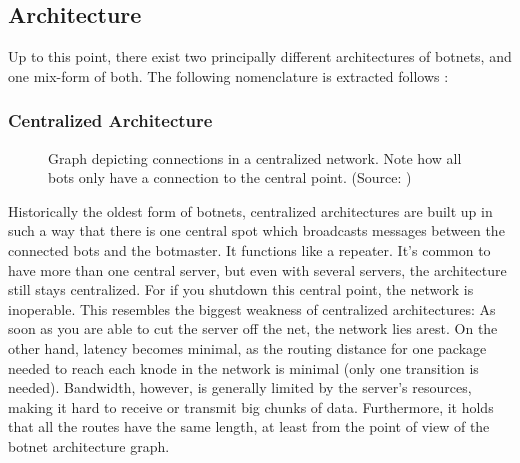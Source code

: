 \documentclass{llncs}
\begin{document}
\subsection{Architecture}
Up to this point, there exist two principally different architectures
of botnets, and one mix-form of both. The following nomenclature is
extracted follows \cite{steggink2007detection}:
\subsubsection{Centralized Architecture}
%
%
\begin{figure}[htbp]
  \centering
  \caption{Graph depicting connections in a centralized network. Note
    how all bots only have a connection to the central point. (Source:
    \cite{dittrich2007command})}
  \label{central-network}
\end{figure}
Historically the oldest form of botnets, centralized architectures are
built up in such a way that there is one central spot which broadcasts
messages between the connected bots and the botmaster. It functions
like a repeater. It's common to have more than one central
server\cite{td1sc}, but even with several servers, the architecture
still stays centralized. For if you shutdown this central point, the
network is inoperable. This resembles the biggest weakness of
centralized architectures: As soon as you are able to cut the server
off the net, the network lies arest. On the other hand, latency
becomes minimal, as the routing distance for one package needed to
reach each knode in the network is minimal (only one transition is
needed). Bandwidth, however, is generally limited by the server's
resources, making it hard to receive or transmit big chunks of
data. Furthermore, it holds that all the routes have the same length,
at least from the point of view of the botnet architecture graph.
\end{document}
